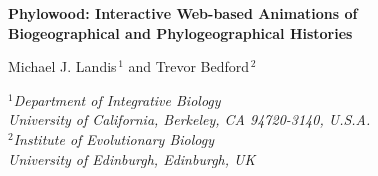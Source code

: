 \documentclass[11pt]{article}
\begin{document}


\begin{titlepage}
\begin{center}
{\Large\bf Phylowood: Interactive Web-based Animations of\\Biogeographical and Phylogeographical Histories}

\bigskip

{\sc Michael J. Landis$^{\,1}$ and Trevor Bedford$^{\,2}$} \\

\bigskip

{\em
$\mbox{}^1$Department of Integrative Biology\\
\vspace{-0.4\baselineskip}
University of California, Berkeley, CA 94720-3140, \mbox{U.S.A.} \\

$\mbox{}^2$Institute of Evolutionary Biology\\
\vspace{-0.4\baselineskip}
University of Edinburgh, Edinburgh, UK \\
}
\end{center}

\bigskip

\begin{abstract}

 Phylowood is a web service that uses Javascript to generate in-browser animations of biogeographical and phylogeographical histories from annotated phylogenetic input. The animations are interactive, allowing the user to adjust spatial and temporal resolution, and highlight phylogenetic lineages of interest.

 All documentation and source code for Phylowood is freely available at \\
\texttt{https://github.com/mlandis/phylowood} and a live web application is available at \\
\texttt{https://mlandis.github.io/phylowood}.

 mlandis@berkeley.edu

\end{abstract}

\end{titlepage}



\end{document}

